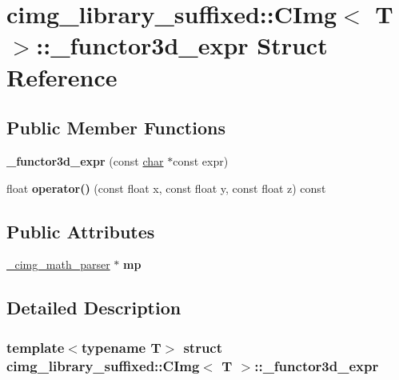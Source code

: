 \hypertarget{structcimg__library__suffixed_1_1CImg_1_1__functor3d__expr}{}\section{cimg\+\_\+library\+\_\+suffixed\+:\+:C\+Img$<$ T $>$\+:\+:\+\_\+functor3d\+\_\+expr Struct Reference}
\label{structcimg__library__suffixed_1_1CImg_1_1__functor3d__expr}
\subsection*{Public Member Functions}
\begin{DoxyCompactItemize}
\item 
\mbox{\label{structcimg__library__suffixed_1_1CImg_1_1__functor3d__expr_a5a4b87e578cd3812e35ba9e9ae540a75}} 
{\bfseries \+\_\+functor3d\+\_\+expr} (const \hyperlink{classchar}{char} $\ast$const expr)
\item 
\mbox{\label{structcimg__library__suffixed_1_1CImg_1_1__functor3d__expr_af766dab4864f9b794f51102234f02d75}} 
float {\bfseries operator()} (const float x, const float y, const float z) const
\end{DoxyCompactItemize}
\subsection*{Public Attributes}
\begin{DoxyCompactItemize}
\item 
\mbox{\label{structcimg__library__suffixed_1_1CImg_1_1__functor3d__expr_a13d32c6406780bb120d469b0a401d86a}} 
\hyperlink{structcimg__library__suffixed_1_1CImg_1_1__cimg__math__parser}{\+\_\+cimg\+\_\+math\+\_\+parser} $\ast$ {\bfseries mp}
\end{DoxyCompactItemize}


\subsection{Detailed Description}
\subsubsection*{template$<$typename T$>$\newline
struct cimg\+\_\+library\+\_\+suffixed\+::\+C\+Img$<$ T $>$\+::\+\_\+functor3d\+\_\+expr}



